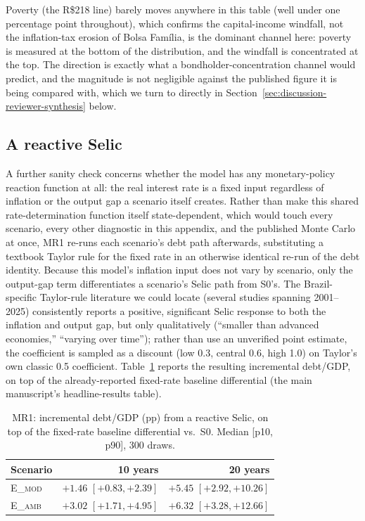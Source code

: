 \documentclass[11pt,a4paper]{article}
\begin{document}
Poverty (the R\$218 line) barely moves anywhere in this table (well under one percentage point throughout), which confirms the capital-income windfall, not the inflation-tax erosion of Bolsa Fam\'ilia, is the dominant channel here: poverty is measured at the bottom of the distribution, and the windfall is concentrated at the top. The direction is exactly what a bondholder-concentration channel would predict, and the magnitude is not negligible against the published figure it is being compared with, which we turn to directly in Section~\ref{sec:discussion-reviewer-synthesis} below.

\subsection{A reactive Selic}

A further sanity check concerns whether the model has any monetary-policy reaction function at all: the real interest rate is a fixed input regardless of inflation or the output gap a scenario itself creates. Rather than make this shared rate-determination function itself state-dependent, which would touch every scenario, every other diagnostic in this appendix, and the published Monte Carlo at once, MR1 re-runs each scenario's debt path afterwards, substituting a textbook Taylor rule \citep{taylor1993} for the fixed rate in an otherwise identical re-run of the debt identity. Because this model's inflation input does not vary by scenario, only the output-gap term differentiates a scenario's Selic path from \textsc{S0}'s. The Brazil-specific Taylor-rule literature we could locate (several studies spanning 2001--2025) consistently reports a positive, significant Selic response to both the inflation and output gap, but only qualitatively (``smaller than advanced economies,'' ``varying over time''); rather than use an unverified point estimate, the coefficient is sampled as a discount (low 0.3, central 0.6, high 1.0) on Taylor's own classic 0.5 coefficient. Table~\ref{tab:mr1} reports the resulting incremental debt/GDP, on top of the already-reported fixed-rate baseline differential (the main manuscript's headline-results table).

\begin{table}[htbp]
\centering\small
\caption{MR1: incremental debt/GDP (pp) from a reactive Selic, on top of the fixed-rate baseline differential vs.\ \textsc{S0}. Median [p10, p90], 300 draws.}
\label{tab:mr1}
\begin{tabular}{lrr}
\toprule
Scenario & 10 years & 20 years \\
\midrule
\textsc{E\_mod} & $+1.46$ $[+0.83,+2.39]$ & $+5.45$ $[+2.92,+10.26]$ \\
\textsc{E\_amb} & $+3.02$ $[+1.71,+4.95]$ & $+6.32$ $[+3.28,+12.66]$ \\
\bottomrule
\end{tabular}
\end{table}
\end{document}
